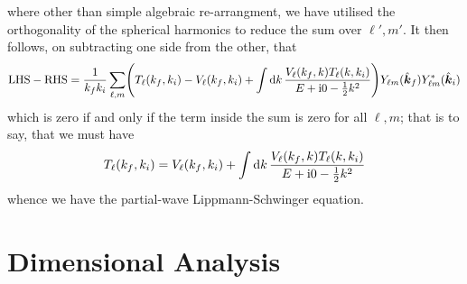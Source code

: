 \documentclass{article}
\begin{document}
where other than simple algebraic re-arrangment, we have utilised the
orthogonality of the spherical harmonics to reduce the sum over $\ell', m'$.
It then follows, on subtracting one side from the other, that
\begin{equation*}
  \mathrm{LHS}
  -
  \mathrm{RHS}
  =
  \dfrac{1}{k_{f} k_{i}}
  \sum_{\ell, m}
  \lr[\Bigg]
  {
    T_{\ell}\lr{k_{f}, k_{i}}
    -
    V_{\ell}\lr{k_{f}, k_{i}}
    +
    \int
    \dd{k}
    \dfrac
    {
      V_{\ell}\lr{k_{f}, k}
      T_{\ell}\lr{k, k_{i}}
    }
    {
      E
      +
      \imath 0
      -
      \tfrac{1}{2}
      k^{2}
    }
  }
  Y_{\ell m}\lr{\hat{\boldsymbol{k}}_{f}}
  Y_{\ell m}^{*}\lr{\hat{\boldsymbol{k}}_{i}}
\end{equation*}
which is zero if and only if the term inside the sum is zero for all $\ell, m$;
that is to say, that we must have
\begin{equation}
  \label{eq:lippmann-schwinger-partial-wave}
  T_{\ell}\lr{k_{f}, k_{i}}
  =
  V_{\ell}\lr{k_{f}, k_{i}}
  +
  \int
  \dd{k}
  \dfrac
  {
    V_{\ell}\lr{k_{f}, k}
    T_{\ell}\lr{k, k_{i}}
  }
  {
    E
    +
    \imath 0
    -
    \tfrac{1}{2}
    k^{2}
  }
\end{equation}
whence we have the partial-wave Lippmann-Schwinger equation.

\section{Dimensional Analysis}
\label{sec:dimensional-analysis}
\end{document}
